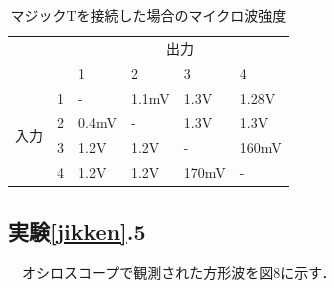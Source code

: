   \begin{table}[H]
    \centering
    \caption{マジックTを接続した場合のマイクロ波強度}
    \begin{tabular}{cl|l|l|l|l|}
    \cline{3-6}
    \multicolumn{1}{l}{}                      &   & \multicolumn{4}{c|}{出力}       \\ \cline{3-6}
    \multicolumn{1}{l}{}                      &   & 1     & 2     & 3     & 4     \\ \hline
    \multicolumn{1}{|c|}{\multirow{4}{*}{入力}} & 1 &    -   & 1.1mV & 1.3V  & 1.28V \\ \cline{2-6}
    \multicolumn{1}{|c|}{}                    & 2 & 0.4mV &   -    & 1.3V  & 1.3V  \\ \cline{2-6}
    \multicolumn{1}{|c|}{}                    & 3 & 1.2V  & 1.2V  &    -   & 160mV \\ \cline{2-6}
    \multicolumn{1}{|c|}{}                    & 4 & 1.2V  & 1.2V  & 170mV &   -    \\ \hline
    \end{tabular}
  \end{table}

  \subsection{実験\ref{jikken}.5}
  　オシロスコープで観測された方形波を図8に示す．

